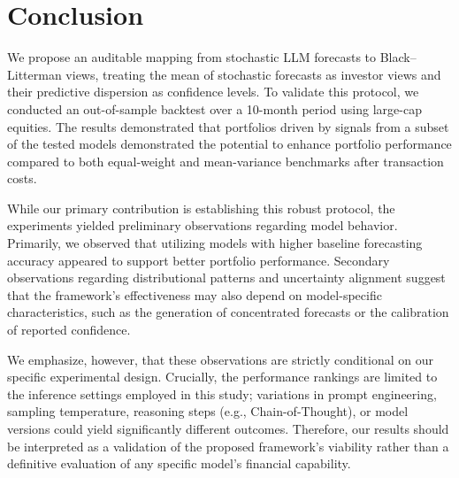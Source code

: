 \section{Conclusion}

We propose an auditable mapping from stochastic LLM forecasts to Black–Litterman views, treating the mean of stochastic forecasts as investor views and their predictive dispersion as confidence levels. To validate this protocol, we conducted an out-of-sample backtest over a 10-month period using large-cap equities. The results demonstrated that portfolios driven by signals from a subset of the tested models demonstrated the potential to enhance portfolio performance compared to both equal‑weight and mean-variance benchmarks after transaction costs. 

While our primary contribution is establishing this robust protocol, the experiments yielded preliminary observations regarding model behavior.
Primarily, we observed that utilizing models with higher baseline forecasting accuracy appeared to support better portfolio performance.
Secondary observations regarding distributional patterns and uncertainty alignment suggest that the framework's effectiveness may also depend on model-specific characteristics, such as the generation of concentrated forecasts or the calibration of reported confidence.

We emphasize, however, that these observations are strictly conditional on our specific experimental design.
Crucially, the performance rankings are limited to the inference settings employed in this study; variations in prompt engineering, sampling temperature, reasoning steps (e.g., Chain-of-Thought), or model versions could yield significantly different outcomes. 
Therefore, our results should be interpreted as a validation of the proposed framework's viability rather than a definitive evaluation of any specific model's financial capability.
